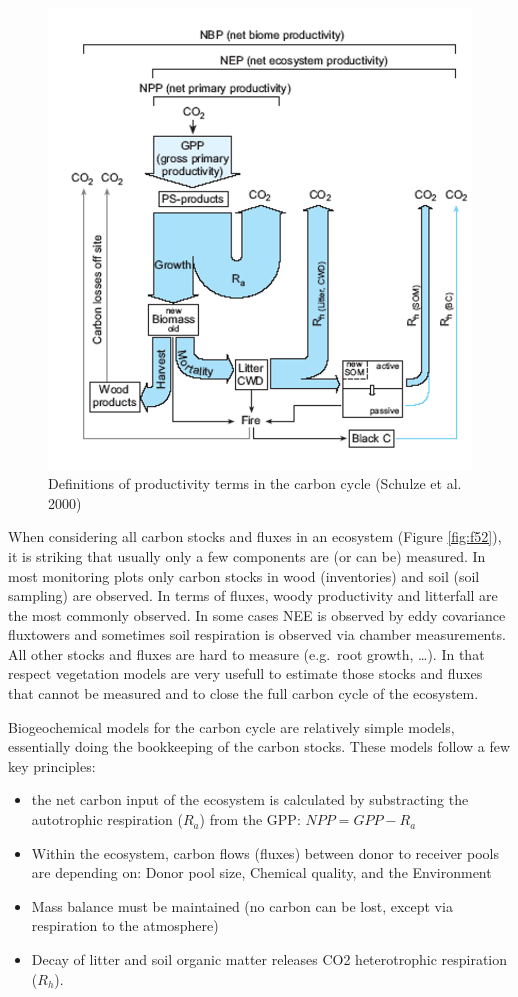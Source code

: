 \documentclass[12pt,oneside]{book}
\begin{document}
\begin{figure}

{\centering \includegraphics[width=0.8\linewidth]{figures/chap5/f53_GPP_NBP} 

}

\caption{Definitions of productivity terms in the carbon cycle (Schulze et al. 2000)}\label{fig:f53}
\end{figure}

When considering all carbon stocks and fluxes in an ecosystem (Figure
\ref{fig:f52}), it is striking that usually only a few components are
(or can be) measured. In most monitoring plots only carbon stocks in
wood (inventories) and soil (soil sampling) are observed. In terms of
fluxes, woody productivity and litterfall are the most commonly
observed. In some cases NEE is observed by eddy covariance fluxtowers
and sometimes soil respiration is observed via chamber measurements. All
other stocks and fluxes are hard to measure (e.g.~root growth,
\ldots{}). In that respect vegetation models are very usefull to
estimate those stocks and fluxes that cannot be measured and to close
the full carbon cycle of the ecosystem.

Biogeochemical models for the carbon cycle are relatively simple models,
essentially doing the bookkeeping of the carbon stocks. These models
follow a few key principles:

\begin{itemize}
\item
  the net carbon input of the ecosystem is calculated by substracting
  the autotrophic respiration (\(R_a\)) from the GPP:
  \(NPP = GPP - R_a\)
\item
  Within the ecosystem, carbon flows (fluxes) between donor to receiver
  pools are depending on: Donor pool size, Chemical quality, and the
  Environment
\item
  Mass balance must be maintained (no carbon can be lost, except via
  respiration to the atmosphere)
\item
  Decay of litter and soil organic matter releases CO2 heterotrophic
  respiration (\(R_h\)).
\end{itemize}
\end{document}
